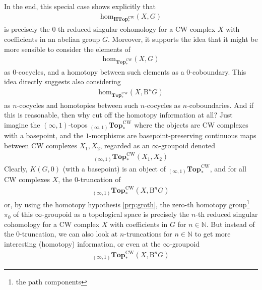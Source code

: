 In the end, this special case shows explicitly that
\begin{align*}
  \mathrm{hom}_{\mathbf{HTop}_{\ast}^{\textrm{CW}}}
  \left(
    X,
    G
  \right)
\end{align*}
is precisely the $0$-th reduced singular cohomology for a CW complex $X$ with coefficients in an abelian group $G$.
Moreover, it supports the idea that it might be more sensible to consider the elements of
\begin{align*}
  \mathrm{hom}_{\mathbf{Top}_{\ast}^{\textrm{CW}}}
  \left(
    X,
    G
  \right)
\end{align*}
as $0$-cocycles, and a homotopy between such elements as a $0$-coboundary.
This idea directly suggests also considering
\begin{align*}
  \mathrm{hom}_{\mathbf{Top}_{\ast}^{\textrm{CW}}}
  \left(
    X,
    \mathrm{B}^{n}G
  \right)
\end{align*}
as $n$-cocycles and homotopies between such $n$-cocycles as $n$-coboundaries.
And if this is reasonable, then why cut off the homotopy information at all?
Just imagine the $(\infty,1)$-topos ${}_{(\infty,1)}\mathbf{Top}_{\ast}^{\textrm{CW}}$ where the objects are CW complexes with a basepoint, and the $1$-morphisms are basepoint-preserving continuous maps between CW complexes $X_{1}, X_{2}$, regarded as an $\infty$-groupoid denoted
\begin{align*}
  {}_{(\infty,1)}\mathbf{Top}_{\ast}^{\textrm{CW}}(X_{1},X_{2})
\end{align*}
Clearly, $K(G,0)$ (with a basepoint) is an object of ${}_{(\infty,1)}\mathbf{Top}_{\ast}^{\textrm{CW}}$, and for all CW complexes $X$, the $0$-truncation of
\begin{align*}
  {}_{(\infty,1)}\mathbf{Top}_{\ast}^{\textrm{CW}}
  \left(
    X,
    \mathrm{B}^{n}G
  \right)
\end{align*}
or, by using the homotopy hypothesis \ref{prp:groth}, the zero-th homotopy group\footnote{the path components} $\pi_{0}$ of this $\infty$-groupoid as a topological space is precisely the $n$-th reduced singular cohomology for a CW complex $X$ with coefficients in $G$ for $n \in \mathbb{N}$.
But instead of the $0$-truncation, we can also look at $n$-truncations for $n \in \mathbb{N}$ to get more interesting (homotopy) information, or even at the $\infty$-groupoid
\begin{align*}
  {}_{(\infty,1)}\mathbf{Top}_{\ast}^{\textrm{CW}}
  \left(
    X,
    \mathrm{B}^{n}G
  \right)
\end{align*}
